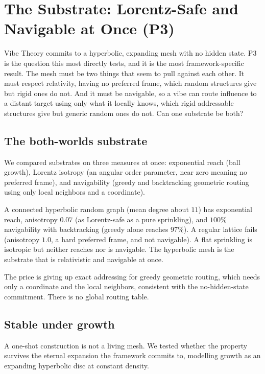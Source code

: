 \section{The Substrate: Lorentz-Safe and Navigable at Once (P3)}
\label{sec:substrate}

Vibe Theory commits to a hyperbolic, expanding mesh with no hidden state. P3 is the question this most directly tests, and it is the most framework-specific result. The mesh must be two things that seem to pull against each other. It must respect relativity, having no preferred frame, which random structures give but rigid ones do not. And it must be navigable, so a vibe can route influence to a distant target using only what it locally knows, which rigid addressable structures give but generic random ones do not. Can one substrate be both?

\subsection{The both-worlds substrate}

We compared substrates on three measures at once: exponential reach (ball growth), Lorentz isotropy (an angular order parameter, near zero meaning no preferred frame), and navigability (greedy and backtracking geometric routing using only local neighbors and a coordinate).

\begin{result}
A connected hyperbolic random graph (mean degree about $11$) has exponential reach, anisotropy $0.07$ (as Lorentz-safe as a pure sprinkling), and $100\%$ navigability with backtracking (greedy alone reaches $97\%$). A regular lattice fails (anisotropy $1.0$, a hard preferred frame, and not navigable). A flat sprinkling is isotropic but neither reaches nor is navigable. The hyperbolic mesh is the substrate that is relativistic and navigable at once.
\end{result}

The price is giving up exact addressing for greedy geometric routing, which needs only a coordinate and the local neighbors, consistent with the no-hidden-state commitment. There is no global routing table.

\subsection{Stable under growth}

A one-shot construction is not a living mesh. We tested whether the property survives the eternal expansion the framework commits to, modelling growth as an expanding hyperbolic disc at constant density.

